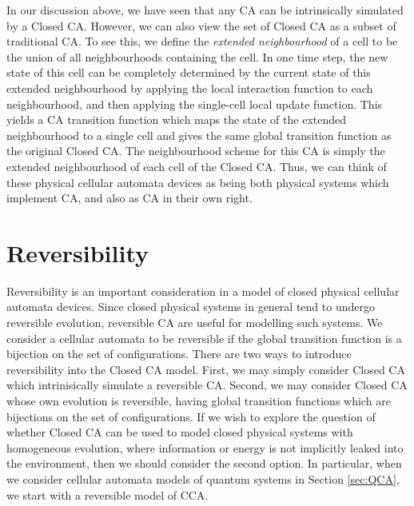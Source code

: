 \documentclass{jca}
\begin{document}
In our discussion above, we have seen that any CA can be intrinsically simulated by a Closed CA.
However, we can also view the set of Closed CA as a subset of traditional CA.
To see this, we define the \emph{extended neighbourhood} of a cell to be the union of all neighbourhoods containing the cell.
In one time step, the new state of this cell can be completely determined by the current state of this extended neighbourhood by applying the local interaction function to each neighbourhood, and then applying the single-cell local update function.
This yields a CA transition function which maps the state of the extended neighbourhood to a single cell and gives the same global transition function as the original Closed CA.
The neighbourhood scheme for this CA is simply the extended neighbourhood of each cell of the Closed CA.
Thus, we can think of these physical cellular automata devices as being both physical systems which implement CA, and also as CA in their own right.

\section{Reversibility}\label{sec:Rev}


Reversibility is an important consideration in a model of closed physical cellular automata devices.
Since closed physical systems in general tend to undergo reversible evolution, reversible CA are useful for modelling such systems.
We consider a cellular automata to be reversible if the global transition function is a bijection on the set of configurations.
There are two ways to introduce reversibility into the Closed CA model.
First, we may simply consider Closed CA which intrinisically simulate a reversible CA.
Second, we may consider Closed CA whose own evolution is reversible, having global transition functions  which are bijections on the set of configurations.
If we wish to explore the question of whether Closed CA can be used to model closed physical systems with homogeneous evolution, where information or energy is not implicitly leaked into the environment, then we should consider the second option.
In particular, when we consider cellular automata models of quantum systems in Section \ref{sec:QCA}, we start with a reversible model of CCA.
\end{document}
